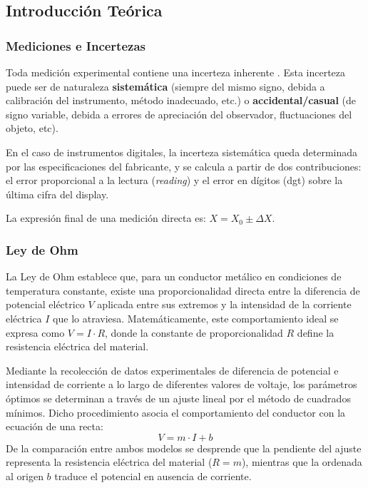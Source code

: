 \subsection{Introducción Teórica}
\label{subsec:introduccion-teorica}


\subsubsection{Mediciones e Incertezas}

Toda medición experimental contiene una incerteza inherente \cite{catedra2007mediciones}.
Esta incerteza puede ser de naturaleza \textbf{sistemática} (siempre del mismo signo, debida a calibración del instrumento, método inadecuado, etc.) o \textbf{accidental/casual} (de signo variable, debida a errores de apreciación del observador, fluctuaciones del objeto, etc).

En el caso de instrumentos digitales, la incerteza sistemática queda determinada por las especificaciones del fabricante, y se calcula a partir de dos contribuciones: el error proporcional a la lectura (\textit{reading}) y el error en dígitos (dgt) sobre la última cifra del display.

La expresión final de una medición directa es: $X = X_0 \pm \Delta X$.


\subsubsection{Ley de Ohm}La Ley de Ohm establece que, para un conductor metálico en condiciones de temperatura constante, existe una proporcionalidad directa entre la diferencia de potencial eléctrico $V$ aplicada entre sus extremos y la intensidad de la corriente eléctrica $I$ que lo atraviesa. Matemáticamente, este comportamiento ideal se expresa como $V = I \cdot R$, donde la constante de proporcionalidad $R$ define la resistencia eléctrica del material. 

Mediante la recolección de datos experimentales de diferencia de potencial e intensidad de corriente a lo largo de diferentes valores de voltaje, los parámetros óptimos se determinan a través de un ajuste lineal por el método de cuadrados mínimos. Dicho procedimiento asocia el comportamiento del conductor con la ecuación de una recta:
\begin{equation}
V = m \cdot I + b
\end{equation}
De la comparación entre ambos modelos se desprende que la pendiente del ajuste representa la resistencia eléctrica del material ($R = m$), mientras que la ordenada al origen $b$ traduce el potencial en ausencia de corriente. 

